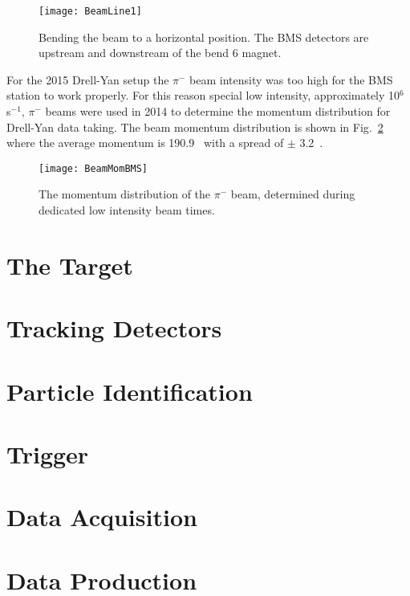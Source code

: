 \begin{figure}[h!t]
  \centering
  \texttt{[image: BeamLine1]}
  \caption{Bending the beam to a horizontal position.  The BMS detectors are
    upstream and downstream of the bend 6 magnet.}
  \label{fig::BeamLine1}
\end{figure}

For the 2015 Drell-Yan setup the $\pi^-$ beam intensity was too high for the BMS
station to work properly.  For this reason special low intensity, approximately
10$^6$ s$^{-1}$, $\pi^-$ beams were used in 2014 to determine the momentum
distribution for Drell-Yan data taking.  The beam momentum distribution is shown
in Fig.~\ref{fig::BeamMomBMS} where the average momentum is 190.9~{\gvc} with a
spread of $\pm$ 3.2~{\gvc}.

\begin{figure}[h!t]
  \centering
  \texttt{[image: BeamMomBMS]}
  \caption{The momentum distribution of the $\pi^-$ beam, determined during
    dedicated low intensity beam times.}
  \label{fig::BeamMomBMS}
\end{figure}




\section{The Target}

\section{Tracking Detectors}

\section{Particle Identification}

\section{Trigger}

\section{Data Acquisition}

\section{Data Production}

